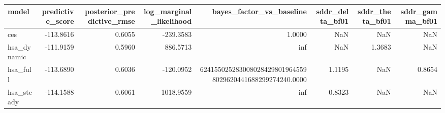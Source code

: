 \begin{tabular}{lrrrrrrr}
\toprule
model & predictive\_score & posterior\_predictive\_rmse & log\_marginal\_likelihood & bayes\_factor\_vs\_baseline & sddr\_delta\_bf01 & sddr\_theta\_bf01 & sddr\_gamma\_bf01 \\
\midrule
ces & -113.8616 & 0.6055 & -239.3583 & 1.0000 & NaN & NaN & NaN \\
hsa\_dynamic & -111.9159 & 0.5960 & 886.5713 & inf & NaN & 1.3683 & NaN \\
hsa\_full & -113.6890 & 0.6036 & -120.0952 & 6241550252830080284298019645598029620441688299274240.0000 & 1.1195 & NaN & 0.8654 \\
hsa\_steady & -114.1588 & 0.6061 & 1018.9559 & inf & 0.8323 & NaN & NaN \\
\bottomrule
\end{tabular}
